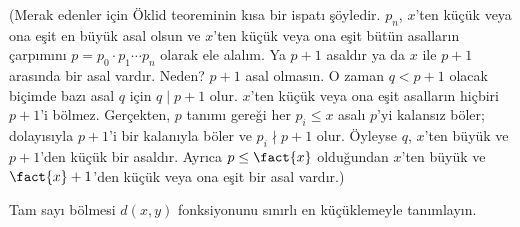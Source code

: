 (Merak edenler için Öklid teoreminin kısa bir ispatı şöyledir. $p_n$,
$x$'ten küçük veya ona eşit en büyük asal olsun ve $x$'ten küçük veya ona
eşit bütün asalların çarpımını
$p=p_0\cdot p_1\cdots p_n$ olarak ele alalım. Ya $p+1$ asaldır ya da $x$ ile
$p+1$ arasında bir asal vardır. Neden? $p+1$ asal olmasın. O zaman
$q<p+1$ olacak biçimde bazı asal $q$ için $q\mid p+1$ olur. $x$'ten küçük
veya ona eşit asalların hiçbiri $p+1$'i bölmez. Gerçekten, $p$ tanımı
gereği her $p_i\leq x$ asalı $p$'yi kalansız böler; dolayısıyla $p+1$'i
bir kalanıyla böler ve $p_i\nmid p+1$ olur. Öyleyse $q$, $x$'ten büyük ve
$p+1$'den küçük bir asaldır. Ayrıca $p\leq\fact{x}$ olduğundan $x$'ten büyük
ve $\fact{x}+1$'den küçük veya ona eşit bir asal vardır.)

\begin{prob}
Tam sayı bölmesi $d(x,y)$ fonksiyonunu sınırlı en küçüklemeyle tanımlayın.
\end{prob}

